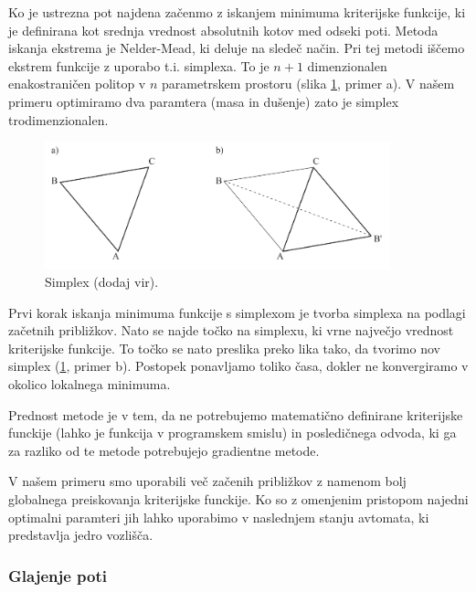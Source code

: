 \documentclass[10pt,a4paper]{article}
\begin{document}
Ko je ustrezna pot najdena začenmo z iskanjem minimuma kriterijske funkcije, ki je definirana kot srednja vrednost absolutnih kotov med odseki poti. Metoda iskanja ekstrema je Nelder-Mead, ki deluje na sledeč način. Pri tej metodi iščemo ekstrem funkcije z uporabo t.i. simplexa. To je $n+1$ dimenzionalen enakostraničen politop v $n$ parametrskem prostoru (slika \ref{fig:slika6}, primer a). V našem primeru optimiramo dva paramtera (masa in dušenje) zato je simplex trodimenzionalen.

\begin{figure}[H]
	\centering
	\includegraphics[width=10cm]{pic/simplex.png}
	\caption{Simplex (dodaj vir).}
	\label{fig:slika6}
\end{figure}

Prvi korak iskanja minimuma funkcije s simplexom je tvorba simplexa na podlagi začetnih približkov. Nato se najde točko na simplexu, ki vrne največjo vrednost kriterijske funkcije. To točko se nato preslika preko lika tako, da tvorimo nov simplex (\ref{fig:slika6}, primer b). Postopek ponavljamo toliko časa, dokler ne konvergiramo v okolico lokalnega minimuma.

Prednost metode je v tem, da ne potrebujemo matematično definirane kriterijske funckije (lahko je funkcija v programskem smislu) in posledičnega odvoda, ki ga za razliko od te metode potrebujejo gradientne metode.

V našem primeru smo uporabili več začenih približkov z namenom bolj globalnega preiskovanja kriterijske funckije. Ko so z omenjenim pristopom najedni optimalni paramteri jih lahko uporabimo v naslednjem stanju avtomata, ki predstavlja jedro vozlišča.

\subsubsection{Glajenje poti}
\end{document}
